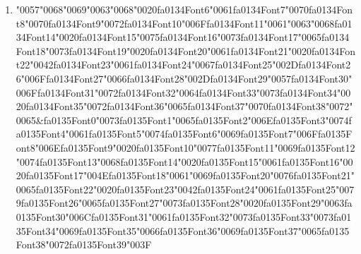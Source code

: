\documentclass[12pt]{article}
\begin{document}
\begin{enumerate}[label=Q\arabic*.]
 \item {\char"0057}{\char"0068}{\char"0069}{\char"0063}{\char"0068}{\char"0020}{\csname fa0134Font6\endcsname\char"0061}{\csname fa0134Font7\endcsname\char"0070}{\csname fa0134Font8\endcsname\char"0070}{\csname fa0134Font9\endcsname\char"0072}{\csname fa0134Font10\endcsname\char"006F}{\csname fa0134Font11\endcsname\char"0061}{\char"0063}{\char"0068}{\csname fa0134Font14\endcsname\char"0020}{\csname fa0134Font15\endcsname\char"0075}{\csname fa0134Font16\endcsname\char"0073}{\csname fa0134Font17\endcsname\char"0065}{\csname fa0134Font18\endcsname\char"0073}{\csname fa0134Font19\endcsname\char"0020}{\csname fa0134Font20\endcsname\char"0061}{\csname fa0134Font21\endcsname\char"0020}{\csname fa0134Font22\endcsname\char"0042}{\csname fa0134Font23\endcsname\char"0061}{\csname fa0134Font24\endcsname\char"0067}{\csname fa0134Font25\endcsname\char"002D}{\csname fa0134Font26\endcsname\char"006F}{\csname fa0134Font27\endcsname\char"0066}{\csname fa0134Font28\endcsname\char"002D}{\csname fa0134Font29\endcsname\char"0057}{\csname fa0134Font30\endcsname\char"006F}{\csname fa0134Font31\endcsname\char"0072}{\csname fa0134Font32\endcsname\char"0064}{\csname fa0134Font33\endcsname\char"0073}{\csname fa0134Font34\endcsname\char"0020}{\csname fa0134Font35\endcsname\char"0072}{\csname fa0134Font36\endcsname\char"0065}{\csname fa0134Font37\endcsname\char"0070}{\csname fa0134Font38\endcsname\char"0072}{\char"0065}\&{\csname fa0135Font0\endcsname\char"0073}{\csname fa0135Font1\endcsname\char"0065}{\csname fa0135Font2\endcsname\char"006E}{\csname fa0135Font3\endcsname\char"0074}{\csname fa0135Font4\endcsname\char"0061}{\csname fa0135Font5\endcsname\char"0074}{\csname fa0135Font6\endcsname\char"0069}{\csname fa0135Font7\endcsname\char"006F}{\csname fa0135Font8\endcsname\char"006E}{\csname fa0135Font9\endcsname\char"0020}{\csname fa0135Font10\endcsname\char"0077}{\csname fa0135Font11\endcsname\char"0069}{\csname fa0135Font12\endcsname\char"0074}{\csname fa0135Font13\endcsname\char"0068}{\csname fa0135Font14\endcsname\char"0020}{\csname fa0135Font15\endcsname\char"0061}{\csname fa0135Font16\endcsname\char"0020}{\csname fa0135Font17\endcsname\char"004E}{\csname fa0135Font18\endcsname\char"0061}{\char"0069}{\csname fa0135Font20\endcsname\char"0076}{\csname fa0135Font21\endcsname\char"0065}{\csname fa0135Font22\endcsname\char"0020}{\csname fa0135Font23\endcsname\char"0042}{\csname fa0135Font24\endcsname\char"0061}{\csname fa0135Font25\endcsname\char"0079}{\csname fa0135Font26\endcsname\char"0065}{\csname fa0135Font27\endcsname\char"0073}{\csname fa0135Font28\endcsname\char"0020}{\csname fa0135Font29\endcsname\char"0063}{\csname fa0135Font30\endcsname\char"006C}{\csname fa0135Font31\endcsname\char"0061}{\csname fa0135Font32\endcsname\char"0073}{\csname fa0135Font33\endcsname\char"0073}{\csname fa0135Font34\endcsname\char"0069}{\csname fa0135Font35\endcsname\char"0066}{\csname fa0135Font36\endcsname\char"0069}{\csname fa0135Font37\endcsname\char"0065}{\csname fa0135Font38\endcsname\char"0072}{\csname fa0135Font39\endcsname\char"003F}

\end{enumerate}
\end{document}
